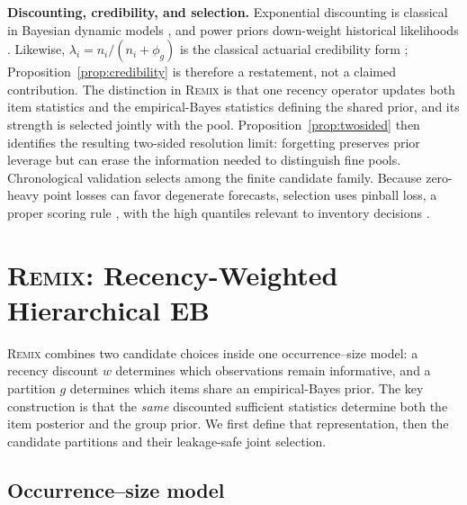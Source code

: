 \documentclass[twocolumn,10pt]{article}
\theoremstyle{definition}
\newcommand{\REMIX}{\textsc{Remix}}
\begin{document}
\textbf{Discounting, credibility, and selection.} Exponential discounting
is classical in Bayesian dynamic models \citep{westharrison1997}, and
power priors down-weight historical likelihoods \citep{ibrahimchen2000}.
Likewise, $\lambda_i=n_i/(n_i+\phi_g)$ is the classical actuarial
credibility form \citep{buhlmann1967}; Proposition~\ref{prop:credibility}
is therefore a restatement, not a claimed contribution. The distinction in
\REMIX{} is that one recency operator updates both item statistics and the
empirical-Bayes statistics defining the shared prior, and its strength is
selected jointly with the pool. Proposition~\ref{prop:twosided} then
identifies the resulting two-sided resolution limit: forgetting preserves
prior leverage but can erase the information needed to distinguish fine
pools. Chronological validation selects among the finite candidate family.
Because zero-heavy point losses can favor degenerate forecasts, selection
uses pinball loss, a proper scoring rule \citep{gneiting2007}, with the
high quantiles relevant to inventory decisions \citep{kolassa2016}.

\section{\REMIX{}: Recency-Weighted Hierarchical EB}\label{sec:method}

\REMIX{} combines two candidate choices inside one occurrence--size
model: a recency discount $w$ determines which observations remain
informative, and a partition $g$ determines which items share an
empirical-Bayes prior. The key construction is that the \emph{same}
discounted sufficient statistics determine both the item posterior and
the group prior. We first define that representation, then the candidate
partitions and their leakage-safe joint selection.

\subsection{Occurrence--size model}\label{sec:base}
\end{document}
